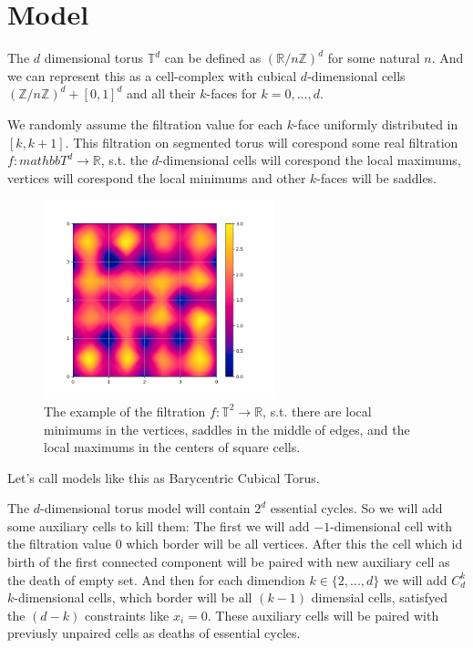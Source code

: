 \documentclass{article}
\begin{document}
\section{Model}
\par The $d$ dimensional torus $\mathbb{T}^d$ can be defined as $\left(\mathbb{R}/n\mathbb{Z}\right)^d$ for some natural $n$. And we can represent this as a cell-complex with cubical $d$-dimensional cells $\left(\mathbb{Z}/n\mathbb{Z}\right)^d + [0, 1]^d$ and all their $k$-faces for $k=0, ..., d$.
\par We randomly assume the filtration value for each $k$-face uniformly distributed in $[k, k+1]$. This filtration on segmented torus will corespond some real filtration $f: mathbb{T}^d\to\mathbb{R}$, s.t. the $d$-dimensional cells will corespond the local maximums, vertices will corespond the local minimums and other $k$-faces will be saddles.
\begin{figure}[h!]
    \centering
    \includegraphics[width=0.6\textwidth]{pics/torus scores/2d-example.png}
    \caption{The example of the filtration $f:\mathbb{T}^2\to\mathbb{R}$, s.t. there are local minimums in the vertices, saddles in the middle of edges, and the local maximums in the centers of square cells.}
    \label{fig:example2d}
\end{figure}
\par Let's call models like this as Barycentric Cubical Torus.
\par The $d$-dimensional torus model will contain $2^d$ essential cycles. So we will add some auxiliary cells to kill them:
The first we will add $-1$-dimensional cell with the filtration value 0 which border will be all vertices. After this the cell which id birth of the first connected component will be paired with new auxiliary cell as the death of empty set. 
And then for each dimendion $k\in\{2, ..., d\}$ we will add $C_d^k$ $k$-dimensional cells, which border will be all $(k-1)$ dimensial cells, satisfyed the $(d - k)$ constraints like $x_i = 0$. These auxiliary cells will be paired with previusly unpaired cells as deaths of essential cycles.
\end{document}
